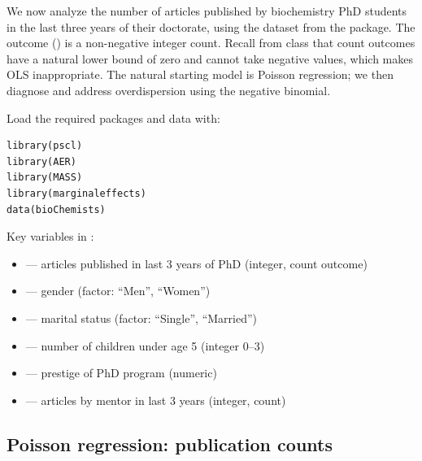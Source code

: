 We now analyze the number of articles published by biochemistry PhD students in the last three years of their doctorate, using the  dataset from the  package. The outcome () is a non-negative integer count. Recall from class that count outcomes have a natural lower bound of zero and cannot take negative values, which makes OLS inappropriate. The natural starting model is Poisson regression; we then diagnose and address overdispersion using the negative binomial.

Load the required packages and data with:
\begin{lstlisting}
library(pscl)
library(AER)
library(MASS)
library(marginaleffects)
data(bioChemists)
\end{lstlisting}

Key variables in :
\begin{itemize}
  \item {} --- articles published in last 3 years of PhD (integer, count outcome)
  \item {} --- gender (factor: ``Men'', ``Women'')
  \item {} --- marital status (factor: ``Single'', ``Married'')
  \item {} --- number of children under age 5 (integer 0--3)
  \item {} --- prestige of PhD program (numeric)
  \item {} --- articles by mentor in last 3 years (integer, count)
\end{itemize}

\subsection{Poisson regression: publication counts}

